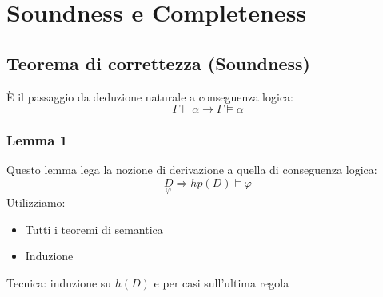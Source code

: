 \documentclass{article}
\theoremstyle{break}
\theoremstyle{break}
\theoremstyle{break}
\theoremstyle{break}
\begin{document}
\section{Soundness e Completeness}
\subsection{Teorema di correttezza (Soundness)}
È il passaggio da deduzione naturale a conseguenza logica:
\[
  \Gamma \vdash \alpha \to \Gamma \models \alpha
\] 
\subsubsection{Lemma 1}
Questo lemma lega la nozione di derivazione a quella di conseguenza logica:
\[
  \underset{\varphi}{D} \Rightarrow hp(D) \models \varphi
\] 
Utilizziamo:
\begin{itemize}
  \item Tutti i teoremi di semantica
  \item Induzione
\end{itemize}
Tecnica: induzione su \( h(D) \) e per casi sull'ultima regola
\end{document}

